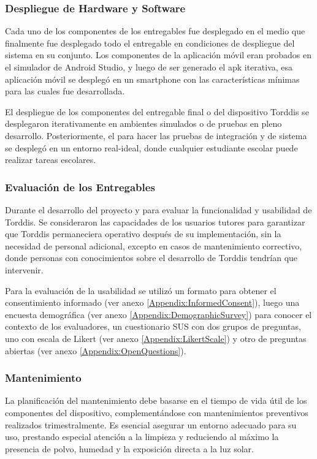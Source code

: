 \subsubsection{Despliegue de Hardware y Software}
Cada uno de los componentes de los entregables fue  desplegado en el medio que finalmente fue desplegado todo el entregable en condiciones de despliegue del sistema en su conjunto. Los componentes de la aplicación móvil eran probados en el simulador de Android Studio, y luego de ser generado el apk iterativa, esa aplicación móvil se desplegó en un smartphone con las características mínimas para las cuales fue desarrollada.

El despliegue de los componentes del entregable final o del dispositivo Torddis se desplegaron iterativamente en ambientes simulados o de pruebas en pleno desarrollo. Posteriormente, el para hacer las pruebas de integración y de sistema se desplegó en un entorno real-ideal, donde cualquier estudiante escolar puede realizar tareas escolares.

\subsubsection{Evaluación de los Entregables}
Durante el desarrollo del proyecto y para evaluar la funcionalidad y usabilidad de Torddis. Se consideraron las capacidades de los usuarios tutores para garantizar que Torddis permaneciera operativo después de su implementación, sin la necesidad de personal adicional, excepto en casos de mantenimiento correctivo, donde personas con conocimientos sobre el desarrollo de Torddis tendrían que intervenir.

Para la evaluación de la usabilidad se utilizó un formato para obtener el consentimiento informado (ver anexo \ref{Appendix:InformedConsent}), luego una encuesta demográfica (ver anexo \ref{Appendix:DemographicSurvey}) para conocer el contexto de los evaluadores, un cuestionario SUS con dos grupos de preguntas, uno con escala de Likert (ver anexo \ref{Appendix:LikertScale}) y otro de preguntas abiertas (ver anexo \ref{Appendix:OpenQuestions}).

\subsubsection{Mantenimiento}		
La planificación del mantenimiento debe basarse en el tiempo de vida útil de los componentes del dispositivo, complementándose con mantenimientos preventivos realizados trimestralmente. Es esencial asegurar un entorno adecuado para su uso, prestando especial atención a la limpieza y reduciendo al máximo la presencia de polvo, humedad y la exposición directa a la luz solar.

